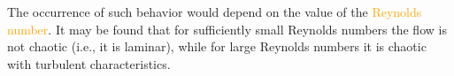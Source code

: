 \documentclass[12pt,a4paper]{article}
\begin{document}
The occurrence of such behavior would depend on the value of the \textcolor{orange}{Reynolds number}. It may be found that for sufficiently small Reynolds numbers the flow is not chaotic (i.e., it is laminar), while for large Reynolds numbers it is chaotic with turbulent characteristics.








































\end{document}
